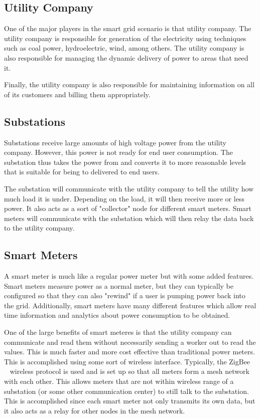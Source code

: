 \subsection{Utility Company}
One of the major players in the smart grid scenario is that utility company. The utility company is responsible for
generation of the electricity using techniques such as coal power, hydroelectric, wind, among others. The utility
company is also responsible for managing the dynamic delivery of power to areas that need it.

Finally, the utility company is also responsible for maintaining information on all of its customers and billing them
appropriately.

\subsection{Substations}
Substations receive large amounts of high voltage power from the utility company. However, this power is not ready
for end user consumption. The substation thus takes the power from and converts it to  more reasonable levels
that is suitable for being to delivered to end users.

The substation will communicate with the utility company to tell the utility how much load it is under. Depending on
the load, it will then receive more or less power. It also acts as a sort of "collector" node for different smart meters.
Smart meters will communicate with the substation which will then relay the data back to the utility company.

\subsection{Smart Meters}
A smart meter is much like a regular power meter but with some added features. Smart meters measure power as
a normal meter, but they can typically be configured so that they can also "rewind" if a user is pumping power back
into the grid. Additionally, smart meters have many different features which allow real time information and analytics
about power consumption to be obtained.

One of the large benefits of smart meteres is that the utility company can communicate and read them without
necessarily sending a worker out to read the values. This is much faster and more cost effective than traditional
power meters. This is accomplished using some sort of wireless interface. Typically, the ZigBee~\cite{zigbee}
~\cite{aminetworking}
wireless protocol is used and is set up so that all meters form a mesh network with each other. This allows meters
that are not within wireless range of a substation (or some other communication center) to still talk to the substation.
This is accomplished since each smart meter not only transmits its own data, but it also acts as a relay for other nodes
in the mesh network.

